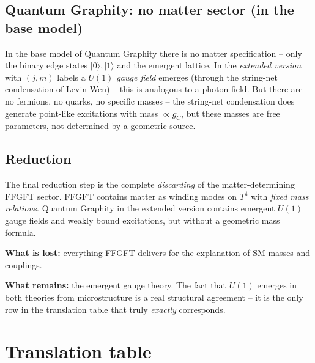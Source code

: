 \subsection{Quantum Graphity: no matter sector (in the base model)}

In the base model of Quantum Graphity there is no matter
specification -- only the binary edge states $|0\rangle, |1\rangle$
and the emergent lattice. In the \emph{extended version} with
$(j, m)$ labels a \emph{$U(1)$ gauge field} emerges (through the
string-net condensation of Levin-Wen) -- this is analogous to a
photon field. But there are no fermions, no quarks, no specific
masses -- the string-net condensation does generate point-like
excitations with mass $\propto g_C$, but these masses are free
parameters, not determined by a geometric source.

\subsection{Reduction}

The final reduction step is the complete \emph{discarding} of the
matter-determining FFGFT sector. FFGFT contains matter as winding
modes on $T^4$ with \emph{fixed mass relations}. Quantum Graphity
in the extended version contains emergent $U(1)$ gauge fields and
weakly bound excitations, but without a geometric mass formula.

\textbf{What is lost:} everything FFGFT delivers for the explanation
of SM masses and couplings.

\textbf{What remains:} the emergent gauge theory. The fact that
$U(1)$ emerges in both theories from microstructure is a real
structural agreement -- it is the only row in the translation
table that truly \emph{exactly} corresponds.

\section{Translation table}

